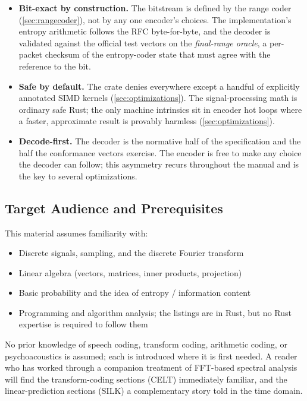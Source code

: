 \begin{itemize}[itemsep=3pt]
  \item \textbf{Bit-exact by construction.} The bitstream is defined by the
    range coder (\cref{sec:rangecoder}), not by any one encoder's choices. The
    implementation's entropy arithmetic follows the RFC byte-for-byte, and the
    decoder is validated against the official test vectors on the
    \emph{final-range oracle}, a per-packet checksum of the entropy-coder
    state that must agree with the reference to the bit.
  \item \textbf{Safe by default.} The crate denies  everywhere
    except a handful of explicitly annotated SIMD kernels
    (\cref{sec:optimizations}). The signal-processing math is ordinary safe
    Rust; the only machine intrinsics sit in encoder hot loops where a
    faster, approximate result is provably harmless (\cref{sec:optimizations}).
  \item \textbf{Decode-first.} The decoder is the normative half of the
    specification and the half the conformance vectors exercise. The encoder is
    free to make any choice the decoder can follow; this asymmetry recurs
    throughout the manual and is the key to several optimizations.
\end{itemize}

\subsection{Target Audience and Prerequisites}\label{subsec:prerequisites}

This material assumes familiarity with:
\begin{itemize}[itemsep=3pt]
  \item Discrete signals, sampling, and the discrete Fourier transform
  \item Linear algebra (vectors, matrices, inner products, projection)
  \item Basic probability and the idea of entropy / information content
  \item Programming and algorithm analysis; the listings are in Rust, but no
    Rust expertise is required to follow them
\end{itemize}

No prior knowledge of speech coding, transform coding, arithmetic coding, or
psychoacoustics is assumed; each is introduced where it is first needed. A
reader who has worked through a companion treatment of FFT-based spectral
analysis will find the transform-coding sections (CELT) immediately familiar,
and the linear-prediction sections (SILK) a complementary story told in the
time domain.

